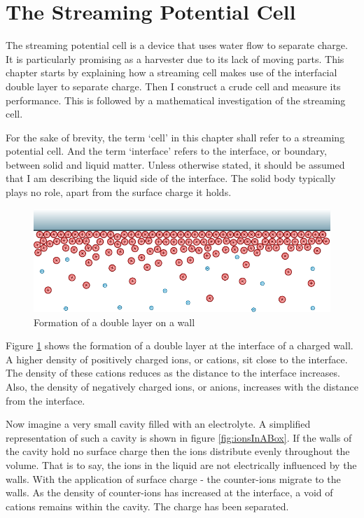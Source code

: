 
\section{The Streaming Potential Cell}
\label{sect:streamingPotentialCell}

The streaming potential cell is a device that uses water flow to separate charge.
It is particularly promising as a harvester due to its lack of moving parts.
This chapter starts by explaining how a streaming cell makes use of the interfacial double layer to separate charge.
Then I construct a crude cell and measure its performance.
This is followed by a mathematical investigation of the streaming cell.

For the sake of brevity, the term `cell' in this chapter shall refer to a streaming potential cell.
And the term `interface' refers to the interface, or boundary, between solid and liquid matter.
Unless otherwise stated, it should be assumed that I am describing the liquid side of the interface.
The solid body typically plays no role, apart from the surface charge it holds.

\begin{figure}
    \centering
    \includegraphics{content/pt1/01-PowerHarvesting/graphics/doubleLayerOnWall}
    \caption{\label{fig:doubleLayerOnWall}Formation of a double layer on a wall}
\end{figure}

Figure \ref{fig:doubleLayerOnWall} shows the formation of a double layer at the interface of a charged wall.
A higher density of positively charged ions, or cations, sit close to the interface.
The density of these cations reduces as the distance to the interface increases.
Also, the density of negatively charged ions, or anions, increases with the distance from the interface.

Now imagine a very small cavity filled with an electrolyte.
A simplified representation of such a cavity is shown in figure \ref{fig:ionsInABox}.
If the walls of the cavity hold no surface charge then the ions distribute evenly throughout the volume.
That is to say, the ions in the liquid are not electrically influenced by the walls.
With the application of surface charge - the counter-ions migrate to the walls.
As the density of counter-ions has increased at the interface, a void of cations remains within the cavity.
The charge has been separated.


